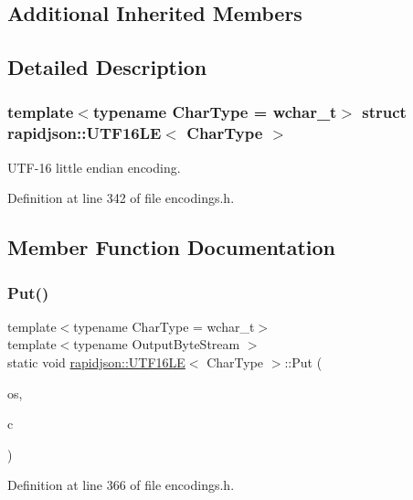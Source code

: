 \subsection*{Additional Inherited Members}


\subsection{Detailed Description}
\subsubsection*{template$<$typename Char\+Type = wchar\+\_\+t$>$\newline
struct rapidjson\+::\+U\+T\+F16\+L\+E$<$ Char\+Type $>$}

U\+T\+F-\/16 little endian encoding. 

Definition at line 342 of file encodings.\+h.



\subsection{Member Function Documentation}
\mbox{\label{structrapidjson_1_1_u_t_f16_l_e_ae3ecd38c70fe23a0a5d8a31866cf9228}} 
\subsubsection{\texorpdfstring{Put()}{Put()}}
{\footnotesize\ttfamily template$<$typename Char\+Type  = wchar\+\_\+t$>$ \\
template$<$typename Output\+Byte\+Stream $>$ \\
static void \mbox{\hyperlink{structrapidjson_1_1_u_t_f16_l_e}{rapidjson\+::\+U\+T\+F16\+LE}}$<$ Char\+Type $>$\+::Put (\begin{DoxyParamCaption}\item[{Output\+Byte\+Stream \&}]{os,  }\item[{Char\+Type}]{c }\end{DoxyParamCaption})\hspace{0.3cm}{\ttfamily [static]}}



Definition at line 366 of file encodings.\+h.


